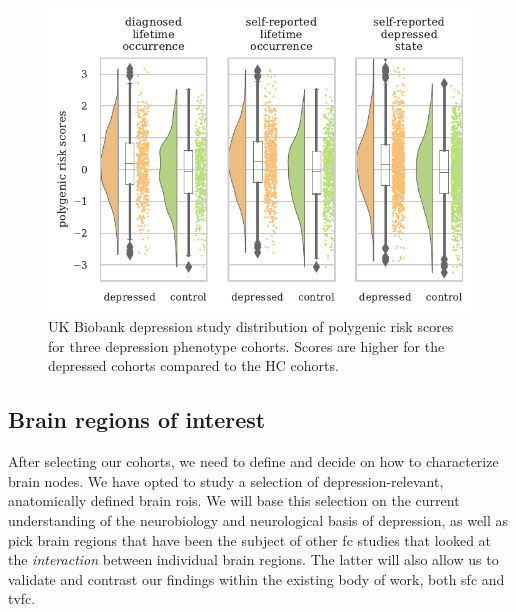 \begin{figure}[t]
  \centering
  \includegraphics[width=\textwidth]{fig/ukbiobank/PRS_all_analyses_per_cohort_joint}
  \caption{
    UK Biobank depression study distribution of polygenic risk scores for three depression phenotype cohorts.
    Scores are higher for the depressed cohorts compared to the HC cohorts.
  }
  \label{fig:ukb-lifetime-occurrence-pgs}
\end{figure}


\subsection{Brain regions of interest}

After selecting our cohorts, we need to define and decide on how to characterize brain nodes.
We have opted to study a selection of depression-relevant, anatomically defined brain \glspl{roi}.
We will base this selection on the current understanding of the neurobiology and neurological basis of depression, as well as pick brain regions that have been the subject of other \gls{fc} studies that looked at the \emph{interaction} between individual brain regions.
The latter will also allow us to validate and contrast our findings within the existing body of work, both \gls{sfc} and \gls{tvfc}.

